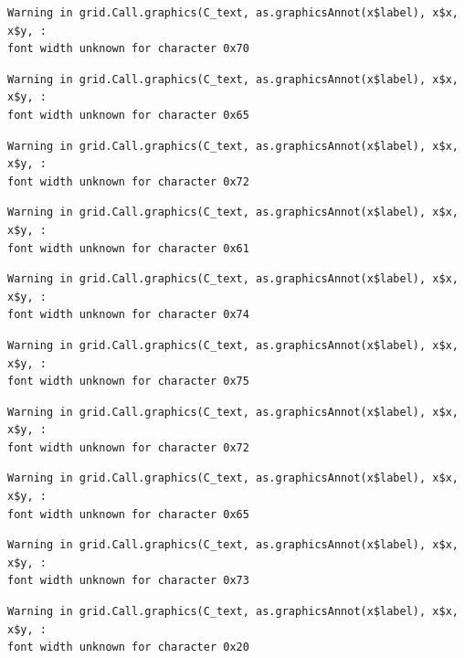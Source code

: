 \documentclass[
  letterpaper,
]{scrbook}
\begin{document}
\begin{verbatim}
Warning in grid.Call.graphics(C_text, as.graphicsAnnot(x$label), x$x, x$y, :
font width unknown for character 0x70
\end{verbatim}

\begin{verbatim}
Warning in grid.Call.graphics(C_text, as.graphicsAnnot(x$label), x$x, x$y, :
font width unknown for character 0x65
\end{verbatim}

\begin{verbatim}
Warning in grid.Call.graphics(C_text, as.graphicsAnnot(x$label), x$x, x$y, :
font width unknown for character 0x72
\end{verbatim}

\begin{verbatim}
Warning in grid.Call.graphics(C_text, as.graphicsAnnot(x$label), x$x, x$y, :
font width unknown for character 0x61
\end{verbatim}

\begin{verbatim}
Warning in grid.Call.graphics(C_text, as.graphicsAnnot(x$label), x$x, x$y, :
font width unknown for character 0x74
\end{verbatim}

\begin{verbatim}
Warning in grid.Call.graphics(C_text, as.graphicsAnnot(x$label), x$x, x$y, :
font width unknown for character 0x75
\end{verbatim}

\begin{verbatim}
Warning in grid.Call.graphics(C_text, as.graphicsAnnot(x$label), x$x, x$y, :
font width unknown for character 0x72
\end{verbatim}

\begin{verbatim}
Warning in grid.Call.graphics(C_text, as.graphicsAnnot(x$label), x$x, x$y, :
font width unknown for character 0x65
\end{verbatim}

\begin{verbatim}
Warning in grid.Call.graphics(C_text, as.graphicsAnnot(x$label), x$x, x$y, :
font width unknown for character 0x73
\end{verbatim}

\begin{verbatim}
Warning in grid.Call.graphics(C_text, as.graphicsAnnot(x$label), x$x, x$y, :
font width unknown for character 0x20
\end{verbatim}
\end{document}
